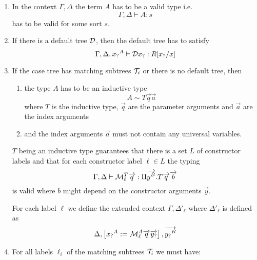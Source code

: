 \begin{enumerate}

    \item In the context $\Gamma,\Delta$ the term $A$ has to be a valid type
        i.e.
        $$
        \Gamma,\Delta
        \vdash
        A: s
        $$
        has to be valid for some sort $s$.

    \item If there is a default tree ${\mathcal D}$, then the default tree has to
        satisfy
        $$
        \Gamma, \Delta, {x_?}^A
        \vdash
        {\mathcal D} {x_?} : R[{x_?} / x]
        $$


    \item If the case tree has matching subtrees ${\mathcal T}_i$ or there is no
        default tree, then

        \begin{enumerate}

            \item
                the type $A$ has to be an inductive type
                $$
                A \sim T \vec q \vec a
                $$
                where $T$ is the inductive type, $\vec q$ are the parameter
                arguments and $\vec a$ are the index arguments

            \item and the index arguments $\vec a$ must not contain any universal
                variables.

        \end{enumerate}

        $T$ being an inductive type guarantees that there is a set $L$ of
        constructor labels and that for each constructor label
        $\ell \in L$ the typing
        $$
        \Gamma, \Delta
        \vdash
        {\cal M}_\ell^T {\overrightarrow {q}}
        :
        \Pi {\overrightarrow {y^B}}. T {\overrightarrow {q}} {\overrightarrow {b}}
        $$
        is valid where $b$ might depend on the constructor arguments $\vec y$.

        For each label $\ell$ we define the extended context $\Gamma,
        \Delta'_\ell$ where $\Delta'_\ell$ is defined as
        $$
            \Delta,
            \left[ {
                {x_?}^A := {\cal M}^A_{\ell} {\overrightarrow {q}} {\overrightarrow {{y_?}}}
            } \right],
            {\overrightarrow {{y_?}^B}}
        $$

    \item
        For all labels $\ell_i$ of the matching subtrees ${\mathcal T}_i$ we must have:
        \begin{enumerate}


\end{enumerate}
\end{enumerate}
